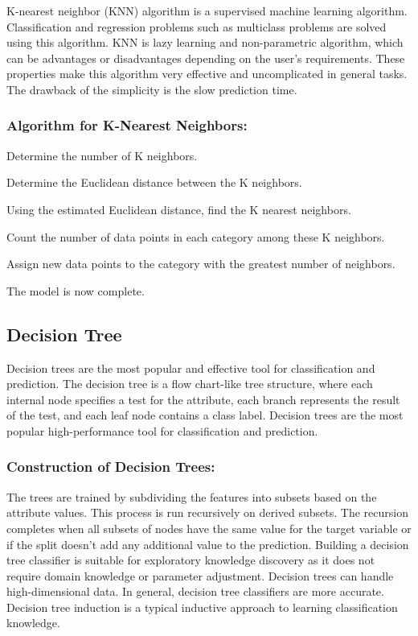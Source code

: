 K-nearest neighbor (KNN) algorithm is a supervised machine learning algorithm. Classification
and regression problems such as multiclass problems are solved using this algorithm. KNN is
lazy learning and non-parametric algorithm, which can be advantages or disadvantages depending
on the user's requirements. These properties make this algorithm very effective and
uncomplicated in general tasks. The drawback of the simplicity is the slow prediction time.

\subsubsection{Algorithm for K-Nearest Neighbors:}
\begin{steps}
    \vspace{-0.5em}
    \setlength{\itemsep}{-0.2em}
    \item Determine the number of K neighbors.
    \item Determine the Euclidean distance between the K neighbors.
    \item Using the estimated Euclidean distance, find the K nearest neighbors.
    \item Count the number of data points in each category among these K neighbors.
    \item Assign new data points to the category with the greatest number of neighbors.
    \item The model is now complete.
    \vspace{-1em}
\end{steps}

\subsection{Decision Tree} \label{subsec:decision_tree}
Decision trees are the most popular and effective tool for classification and prediction. The
decision tree is a flow chart-like tree structure, where each internal node specifies a test
for the attribute, each branch represents the result of the test, and each leaf node contains
a class label. Decision trees are the most popular high-performance tool for classification and
prediction.

\subsubsection{Construction of Decision Trees:}
\vspace{-0.5em}
The trees are trained by subdividing the features into subsets based on the attribute values.
This process is run recursively on derived subsets. The recursion completes when all subsets of
nodes have the same value for the target variable or if the split doesn't add any additional
value to the prediction. Building a decision tree classifier is suitable for exploratory
knowledge discovery as it does not require domain knowledge or parameter adjustment. Decision
trees can handle high-dimensional data. In general, decision tree classifiers are more
accurate. Decision tree induction is a typical inductive approach to learning classification
knowledge.


